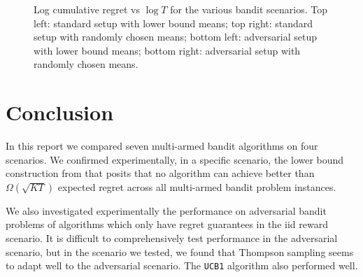 \documentclass[10pt]{article}
\begin{document}
\begin{figure}[!ht]
\begin{tabular}{cc}
    \end{tabular}
    \caption{Log cumulative regret vs $\log T$ for the various bandit scenarios.
    Top left: standard setup with lower bound means; top right: standard setup
    with randomly chosen means; bottom left: adversarial setup with lower bound
    means; bottom right: adversarial setup with randomly chosen means.}
    \label{figure-graphs}
\end{figure}

\section{Conclusion}
In this report we compared seven multi-armed bandit algorithms on four
scenarios. We confirmed experimentally, in a specific scenario, the lower bound
construction from \cite{Slivkins} that posits that no algorithm can achieve
better than $\Omega(\sqrt{KT})$ expected regret across all multi-armed bandit
problem instances.

We also investigated experimentally the performance on adversarial bandit
problems of algorithms which only have regret guarantees in the iid reward
scenario. It is difficult to comprehensively test performance in the adversarial
scenario, but in the scenario we tested, we found that Thompson sampling seems
to adapt well to the adversarial scenario. The \verb'UCB1' algorithm also
performed well.



\end{document}

